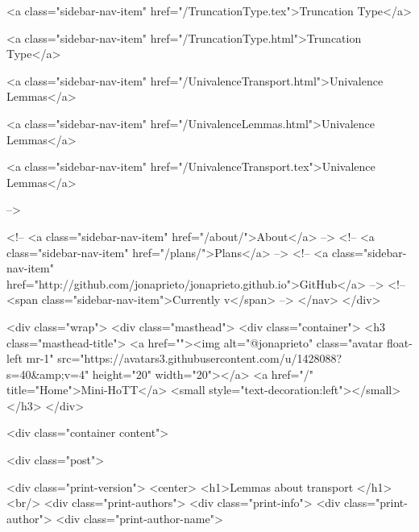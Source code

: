       
    
      
        
          <a class="sidebar-nav-item" href="/TruncationType.tex">Truncation Type</a>
        
      
    
      
        
          <a class="sidebar-nav-item" href="/TruncationType.html">Truncation Type</a>
        
      
    
      
        
          <a class="sidebar-nav-item" href="/UnivalenceTransport.html">Univalence Lemmas</a>
        
      
    
      
        
          <a class="sidebar-nav-item" href="/UnivalenceLemmas.html">Univalence Lemmas</a>
        
      
    
      
        
          <a class="sidebar-nav-item" href="/UnivalenceTransport.tex">Univalence Lemmas</a>
        
      
     -->

    <!-- <a class="sidebar-nav-item" href="/about/">About</a> -->
    <!-- <a class="sidebar-nav-item" href="/plans/">Plans</a> -->
    <!-- <a class="sidebar-nav-item" href="http://github.com/jonaprieto/jonaprieto.github.io">GitHub</a> -->
    <!-- <span class="sidebar-nav-item">Currently v</span> -->
  </nav>
</div>

    <div class="wrap">
      <div class="masthead">
        <div class="container">
          <h3 class="masthead-title">
            <a href=""><img alt="@jonaprieto" class="avatar float-left mr-1" src="https://avatars3.githubusercontent.com/u/1428088?s=40&amp;v=4" height="20" width="20"></a>
            <a href="/" title="Home">Mini-HoTT</a>
            <small style="text-decoration:left"></small>
          </h3>
        </div>
      
      <div class="container content">
        







<div class="post">

  <div class="print-version">
    <center>
      <h1>Lemmas about transport </h1><br/>
        <div class="print-authors">
          <div class="print-info">
            <div class="print-author">
              <div class="print-author-name">
                
